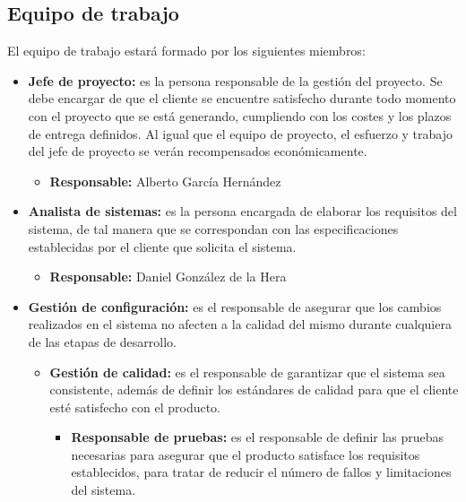 \subsection{Equipo de trabajo}
\par El equipo de trabajo estará formado por los siguientes miembros:
\begin{itemize}
\item \textbf{Jefe de proyecto:} es la persona responsable de la gestión del proyecto. Se debe encargar de que el cliente se encuentre satisfecho durante todo momento con el proyecto que se está generando, cumpliendo con los costes y los plazos de entrega definidos. Al igual que el equipo de proyecto, el esfuerzo y trabajo del jefe de proyecto se verán recompensados económicamente.
  \begin{itemize}
  \item \textbf{Responsable:} Alberto García Hernández
  \end{itemize}
\item \textbf{Analista de sistemas:} es la persona encargada de elaborar los requisitos del sistema, de tal manera que se correspondan con las especificaciones establecidas por el cliente que solicita el sistema.
  \begin{itemize}
  \item \textbf{Responsable:} Daniel González de la Hera
  \end{itemize}
\item \textbf{Gestión de configuración:} es el responsable de asegurar que los cambios realizados en el sistema no afecten a la calidad del mismo durante cualquiera de las etapas de desarrollo. \begin{itemize}
  \begin{itemize}
  \item \textbf{Responsable:} Juan Abascal Sánchez
  \end{itemize}
\item \textbf{Gestión de calidad:} es el responsable de garantizar que el sistema sea consistente, además de definir los estándares de calidad para que el cliente esté satisfecho con el producto. \begin{itemize}
  \begin{itemize}
  \item \textbf{Responsable:} Adriana Lima
  \end{itemize}
\item \textbf{Responsable de pruebas:} es el responsable de definir las pruebas necesarias para asegurar que el producto satisface los requisitos establecidos, para tratar de reducir el número de fallos y limitaciones del sistema.

\end{itemize}
\end{itemize}
\end{itemize}
